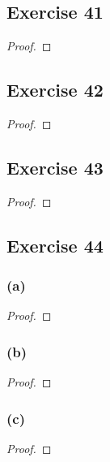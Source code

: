 \documentclass[14pt]{extarticle}
\begin{document}
\subsection{Exercise 41}

\begin{proof}

\end{proof}

\subsection{Exercise 42}

\begin{proof}

\end{proof}

\subsection{Exercise 43}

\begin{proof}

\end{proof}

\subsection{Exercise 44}

\subsubsection{(a)}

\begin{proof}

\end{proof}

\subsubsection{(b)}

\begin{proof}

\end{proof}

\subsubsection{(c)}

\begin{proof}

\end{proof}
\end{document}
